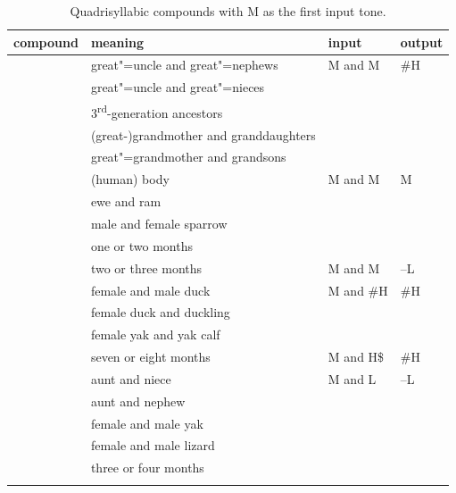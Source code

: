 \begin{subtables}
\begin{table}%
  \caption{Quadrisyllabic compounds with M as the first input tone.}
  \begin{tabularx}{\textwidth}{ l Q l l }
    \lsptoprule
  	compound & meaning & input & output\\ \midrule
	 & great"=uncle and great"=nephews & M and M & \#H\\
	 & great"=uncle and great"=nieces &  &\\
	 & 3\textsuperscript{rd}-generation ancestors &  &\\
	 & (great-)grandmother and granddaughters &  &\\
	 & great"=grandmother and grandsons &  &\\ \addlinespace \hdashline \addlinespace
	 & (human) body & M and M & M\\
	 & ewe and ram &  &\\
	 & male and female sparrow &  &\\
	 & one or two months &  &\\ \addlinespace \hdashline \addlinespace
	 & two or three months & M and M & --L\\ \addlinespace \hdashline \addlinespace
	 & female and male duck & M and \#H & \#H\\
	 & female duck and duckling &  &\\
	 & female yak and yak calf &  &\\ \addlinespace \hdashline \addlinespace
    & seven or eight months & M and H\$ & \#H\\ \addlinespace \hdashline \addlinespace
	 & aunt and niece & M and L & --L\\
	 & aunt and nephew &  &\\
	 & female and male yak &  &\\
	 & female and male lizard &  &\\
	 & three or four months &  &\\
   \lspbottomrule
  \end{tabularx}
\label{tab:examplesofcoordinativecompoundsarrangedbyinputtones}
\end{table}


\end{subtables}
